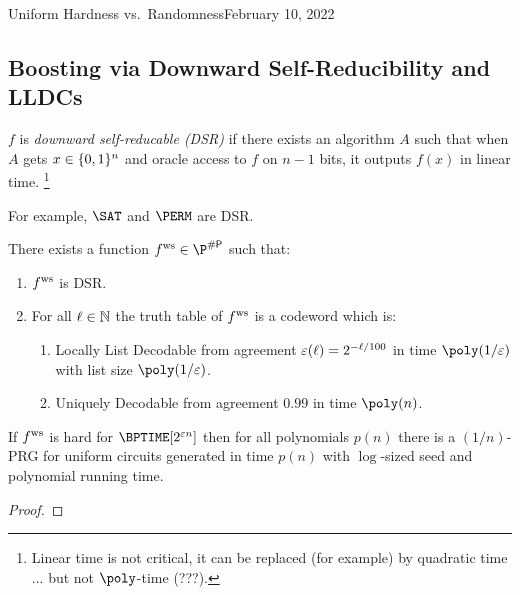 \begin{lecture}{4}{Uniform Hardness vs.\ Randomness}{February 10, 2022}
\subsection{Boosting via Downward Self-Reducibility and LLDCs}

\begin{definition}
  $f$ is \emph{downward self-reducable (DSR)} if there exists an algorithm $A$
  such that when $A$ gets $x \in \{0, 1\}^n$ and oracle access to $f$ on $n -
  1$ bits, it outputs $f(x)$ in linear time.%
  \footnote{Linear time is not critical, it can be replaced (for example) by quadratic time ... but not $\poly$-time (???).}
\end{definition}

For example, $\SAT$ and $\PERM$ are DSR.

\begin{proposition}
	There exists a function $\fws \in \P^{\sharpp}$ such that:
	\begin{enumerate}
		\item $ f^{\text{ws}} $ is DSR.
		\item For all $\ell \in \mathbb{N}$ the truth table of $ f^{\text{ws}} $ is a codeword
			which is:
			\begin{enumerate}
        \item Locally List Decodable from agreement $\varepsilon(\ell) = 2^{-\ell /
          100}$ in time $\poly(1/\eps)$ with list size $\poly(1 / \eps)$.
        \item Uniquely Decodable from agreement $0.99$ in time $\poly(n)$.
			\end{enumerate}
	\end{enumerate}
\end{proposition}

\begin{theorem}
  If $ f^{\text{ws}} $ is hard for $\BPTIME\brac{2^{\eps n}}$ then for all polynomials
  $p(n)$ there is a $(1 / n)$-PRG for uniform circuits generated in time $p(n)$
  with $\log$-sized seed and polynomial running time.
\end{theorem}

\begin{proof}
\end{proof}

\end{lecture}
